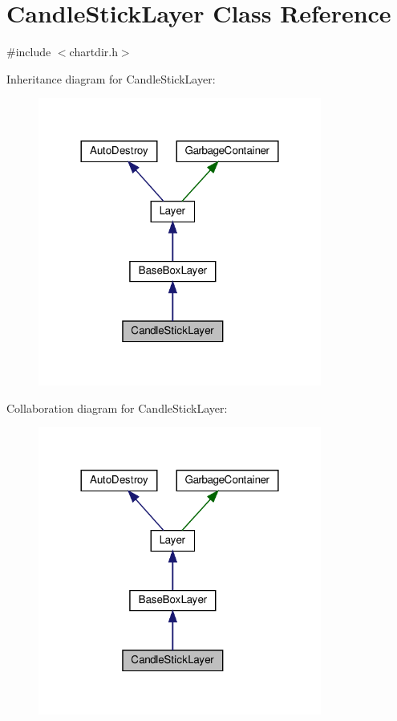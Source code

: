 \hypertarget{class_candle_stick_layer}{}\section{Candle\+Stick\+Layer Class Reference}
\label{class_candle_stick_layer}


{\ttfamily \#include $<$chartdir.\+h$>$}



Inheritance diagram for Candle\+Stick\+Layer\+:
\nopagebreak
\begin{figure}[H]
\begin{center}
\leavevmode
\includegraphics[width=264pt]{class_candle_stick_layer__inherit__graph}
\end{center}
\end{figure}


Collaboration diagram for Candle\+Stick\+Layer\+:
\nopagebreak
\begin{figure}[H]
\begin{center}
\leavevmode
\includegraphics[width=264pt]{class_candle_stick_layer__coll__graph}
\end{center}
\end{figure}
